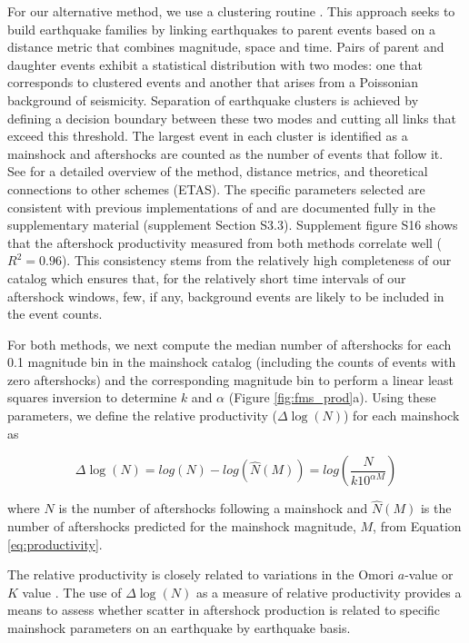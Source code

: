\documentclass[draft, jgrga]{agujournal2018}
\begin{document}
For our alternative method, we use a clustering routine \citep[following][]{Zaliapin2008, Goebel2019AftershockOklahoma}. This approach seeks to build earthquake families by linking earthquakes to parent events based on a distance metric that combines magnitude, space and time. Pairs of parent and daughter events exhibit a statistical distribution with two modes: one that corresponds to clustered events and another that arises from a Poissonian background of seismicity. Separation of earthquake clusters is achieved by defining a decision boundary between these two modes and cutting all links that exceed this threshold. The largest event in each cluster is identified as a mainshock and aftershocks are counted as the number of events that follow it. See \citet{Zaliapin2008} for a detailed overview of the method, distance metrics, and theoretical connections to other schemes (ETAS). The specific parameters selected are consistent with previous implementations of \cite{Zaliapin2008} and are documented fully in the supplementary material (supplement Section S3.3). Supplement figure S16 shows that the aftershock productivity measured from both methods correlate well ($R^2=0.96$). This consistency stems from the relatively high completeness of our catalog which ensures that, for the relatively short time intervals of our aftershock windows, few, if any, background events are likely to be included in the event counts.

For both methods, we next compute the median number of aftershocks for each 0.1 magnitude bin in the mainshock catalog (including the counts of events with zero aftershocks) and the corresponding magnitude bin to perform a linear least squares inversion to determine $k$ and $\alpha$ (Figure \ref{fig:fms_prod}a). Using these parameters, we define the relative productivity ($\Delta \log(N)$) for each mainshock as
%
\begin{linenomath*}
\begin{equation}
    \Delta \log(N) = log(N) - log(\hat{N}(M)) = log\left(\dfrac{N}{k10^{\alpha M}}\right)
    \label{eq:residual_productivity}
\end{equation}
\end{linenomath*}
%
where $N$ is the number of aftershocks following a mainshock and $\hat{N}(M)$ is the number of aftershocks predicted for the mainshock magnitude, $M$, from Equation \ref{eq:productivity}.

The relative productivity is closely related to variations in the Omori $a$-value or $K$ value \citep[e.g.][]{Page, Hardebeck2018UpdatedParameters, Utsu1995,Ogata1988}. The use of $\Delta \log(N)$ as a measure of relative productivity provides a means to assess whether scatter in aftershock production is related to specific mainshock parameters on an earthquake by earthquake basis.
\end{document}
